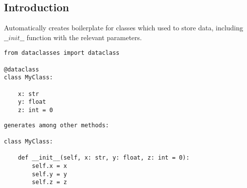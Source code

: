
\subsection{Introduction}

Automatically creates boilerplate for classes which used to store data, including \(\_\_init\_\_\) function with the relevant parameters.

\begin{verbatim}
from dataclasses import dataclass

@dataclass
class MyClass:

    x: str
    y: float
    z: int = 0
\end{verbatim}

\begin{verbatim}
generates among other methods:

class MyClass:

    def __init__(self, x: str, y: float, z: int = 0):
        self.x = x
        self.y = y
        self.z = z
\end{verbatim}


